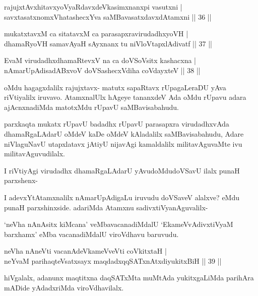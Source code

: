 \begin{shl}
rajujxtAvxhitavxyoVyaRdavxdeVkasimxnanxpi vasutxni |\\
savxtasatxnomxVhatashecxYva saMBavasatxdavxdAtamxni \hfill || 36 ||
\end{shl}

\begin{shl}
mukatxtavxM ca sitatavxM ca parasapxravirudadhxyoVH |\\
dhamaRyoVH samavAyaH sAyxnanx tu niVloVtapxlAdivatf \hfill || 37 ||
\end{shl}

\begin{shl}
EvaM virudadhxdhamaRtevxV na ca doVSoV\s sitx kashacxna |\\
nAmarUpAdisadABxvoV doVSashecxVdiha coVdayxteV \hfill || 38 ||
\end{shl}

\begin{artha}
oMdu hagagxdalilx rajujxtavx- matutx sapaRtavx rUpagaLeraDU yAva riVtiyalilx iruvavo. AtamxnalUlx hAgeye tananxdeV Ada oMdu rUpavu adara ajAcnxnadiMda matotxMdu rUpavU saMBavisabahudu.

parxkaqta mukatx rUpavU badadhx rUpavU parasapxra virudadhxvAda dhamaRgaLAdarU oMdeV kaDe oMdeV kAladalilx saMBavisabahudu, Adare niVlaguNavU utapxlatavx jAtiyU nijavAgi kamaldalilx militavAguvaMte ivu militavAguvudilalx.

I riVtiyAgi virudadhx dhamaRgaLAdarU yAvudoMdu\break doVSavU ilalx punaH parxshenx-

I adevxYtAtamxnalilx nAmarUpAdigaLu iruvudu doVSaveV alalxve? eMdu punaH parxshinxside. adariMda Atamxnu sadivxtiVyanAguvalilx-
\end{artha}%

\begin{artha}
`neVha nAnAsitx kiMcana' veMbavacanadiMdalU `EkameVvA\-\break divxtiVyaM barxhamx' eMba vacanadiMdalU viroVdhavu baruvudu.
\end{artha}


\begin{shl}
neVha nAneVti vacanAdeVkameVveVti coVkitxtaH |\\
neYvaM parihaqteVsatxsayx maqdadxqqSATxnAtxdiyukitxBiH \hfill || 39 ||
\end{shl}

\begin{artha}
hiVgalalx, adanunx maqtitxna daqSATxMta muMtAda yukitxgaLiMda parihAra mADide yAdadxriMda viroVdhavilalx.
\end{artha}

